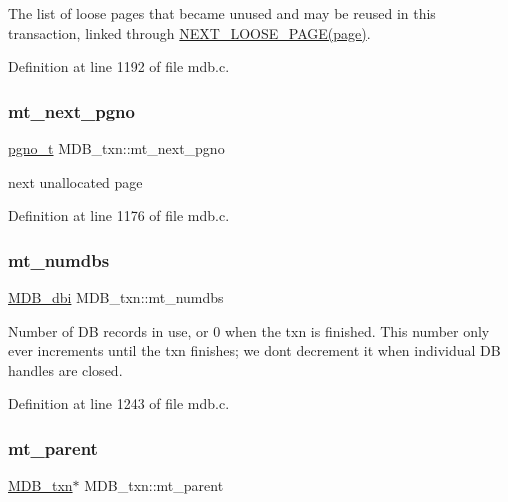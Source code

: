 The list of loose pages that became unused and may be reused in this transaction, linked through \mbox{\hyperlink{group__internal_ga9bebe2cf570ff3959aefcad1fadfd6c2}{N\+E\+X\+T\+\_\+\+L\+O\+O\+S\+E\+\_\+\+P\+A\+G\+E(page)}}. 

Definition at line 1192 of file mdb.\+c.

\mbox{\label{struct_m_d_b__txn_aa805ac6e787ed14ffd131964638901bc}} 
\subsubsection{\texorpdfstring{mt\+\_\+next\+\_\+pgno}{mt\_next\_pgno}}
{\footnotesize\ttfamily \mbox{\hyperlink{group__internal_gadb65f0424c9d3827bf6409087ad555cd}{pgno\+\_\+t}} M\+D\+B\+\_\+txn\+::mt\+\_\+next\+\_\+pgno}

next unallocated page 

Definition at line 1176 of file mdb.\+c.

\mbox{\label{struct_m_d_b__txn_ad4ead449fef79be9fb69c8c4279a6163}} 
\subsubsection{\texorpdfstring{mt\+\_\+numdbs}{mt\_numdbs}}
{\footnotesize\ttfamily \mbox{\hyperlink{group__mdb_gadbe68a06c448dfb62da16443d251a78b}{M\+D\+B\+\_\+dbi}} M\+D\+B\+\_\+txn\+::mt\+\_\+numdbs}

Number of DB records in use, or 0 when the txn is finished. This number only ever increments until the txn finishes; we don\textquotesingle{}t decrement it when individual DB handles are closed. 

Definition at line 1243 of file mdb.\+c.

\mbox{\label{struct_m_d_b__txn_abc63d15f4e57a73ed26089e1ab7fb866}} 
\subsubsection{\texorpdfstring{mt\+\_\+parent}{mt\_parent}}
{\footnotesize\ttfamily \mbox{\hyperlink{struct_m_d_b__txn}{M\+D\+B\+\_\+txn}}$\ast$ M\+D\+B\+\_\+txn\+::mt\+\_\+parent}

